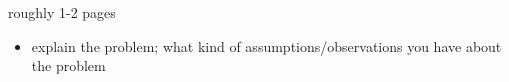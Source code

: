 roughly 1-2 pages
\begin{itemize}
\item explain the problem; what kind of assumptions/observations you have about the problem
\end{itemize}